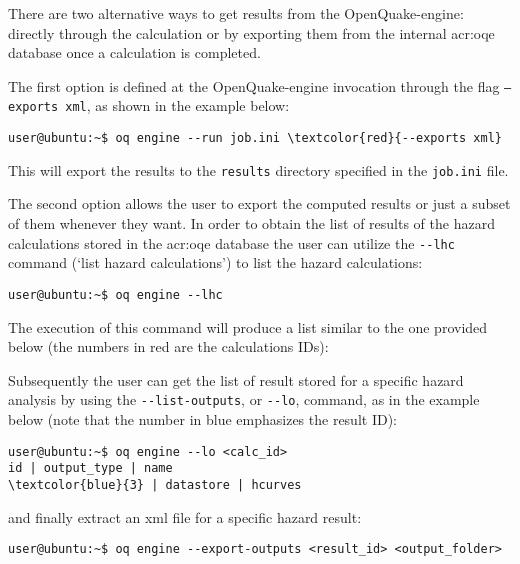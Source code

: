There are two alternative ways to get results from the OpenQuake-engine:
directly through the calculation or by exporting them from the internal
\gls{acr:oqe} database once a calculation is completed.

The first option is defined at the OpenQuake-engine invocation through the
flag \texttt{--exports xml}, as shown in the example below:

\begin{Verbatim}[frame=single, commandchars=\\\{\}, fontsize=\small]
user@ubuntu:~$ oq engine --run job.ini \textcolor{red}{--exports xml}
\end{Verbatim}
\noindent This will export the results to the \verb=results= directory specified in the \verb=job.ini= file. 

The second option allows the user to export the computed results or just a
subset of them whenever they want. In order to obtain the list of results of
the hazard calculations stored in the \gls{acr:oqe} database the user can
utilize the \texttt{-{}-lhc} command (`list hazard calculations') to list the hazard calculations:

\begin{Verbatim}[frame=single, commandchars=\\\{\}, fontsize=\small]
user@ubuntu:~$ oq engine --lhc
\end{Verbatim}

The execution of this command will produce a list similar to the one provided
below (the numbers in red are the calculations IDs):



Subsequently the user can get the list of result stored for a specific hazard
analysis by using the \texttt{-{}-list-outputs}, or \texttt{-{}-lo}, command, as in the example below (note that the number in blue emphasizes the
result ID):

\begin{Verbatim}[frame=single, commandchars=\\\{\}, fontsize=\small]
user@ubuntu:~$ oq engine --lo <calc_id>
id | output_type | name
\textcolor{blue}{3} | datastore | hcurves
\end{Verbatim}

and finally extract an xml file for a specific hazard result:

\begin{Verbatim}[frame=single, commandchars=\\\{\}, fontsize=\small]
user@ubuntu:~$ oq engine --export-outputs <result_id> <output_folder>
\end{Verbatim}


